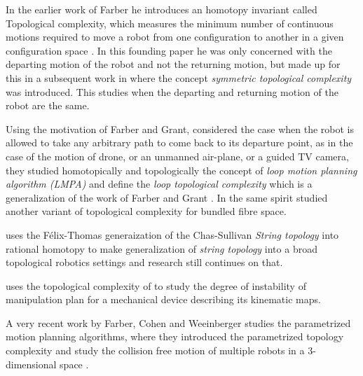 In the earlier work of Farber he introduces an homotopy invariant called Topological complexity, which measures the minimum number of continuous motions required to move a robot from one configuration to another in a given configuration space \cite{farber2003topological}. In this founding paper he was only concerned with the departing motion of the robot and not the returning motion, but made up for this in a subsequent work in \cite{farber2007symmetric} where the concept \textit{symmetric topological complexity} was introduced. This studies when the departing and returning motion of the robot are the same.

Using the motivation of Farber and Grant,\cite{derfoufi2015loop} considered the case when the robot is allowed to take any arbitrary path to come back to its departure point, as in the case of the motion of drone, or an unmanned air-plane, or a guided TV camera, they studied homotopically and topologically the concept of \textit{loop motion planning algorithm (LMPA)}  and define the \textit{loop topological complexity} which is a generalization of the work of Farber and Grant \cite{mamouni2022pure}. In the same spirit \cite{rami2018variant} studied another variant of topological complexity for bundled fibre space.

\cite{derfoufi2016string} uses the F\'elix-Thomas generaization of the Chas-Sullivan \textit{String topology} into rational homotopy to make generalization of \textit{string topology} into a broad topological robotics settings and research still continues on that.

\cite{pavesic2018topologist} uses the topological complexity of \cite{farber2003topological} to study the degree of instability of manipulation plan for a mechanical device describing its kinematic maps.

A very recent work by Farber, Cohen and Weeinberger studies the parametrized motion planning algorithms, where they introduced the parametrized topology complexity and study the collision free motion of multiple robots in a 3-dimensional space \cite{cohen2021topology}.


